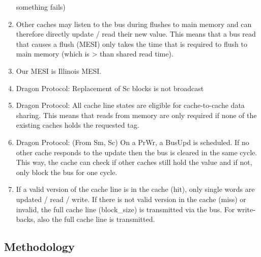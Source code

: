 \begin{enumerate}
          something fails)
    \item Other caches may listen to the bus during flushes to main memory and can therefore directly
          update / read their new value. This means that a bus read that causes a flush (MESI) only takes the
          time that is required to flush to main memory (which is > than shared read time).
    \item Our MESI is Illinois MESI.
    \item Dragon Protocol: Replacement of Sc blocks is not broadcast
    \item Dragon Protocol: All cache line states are eligible for cache-to-cache data sharing. This
          means that reads from memory are only required if none of the existing caches holds the requested
          tag.
    \item Dragon Protocol: (From Sm, Sc) On a PrWr, a BusUpd is scheduled. If no other cache responds to
          the update then the bus is cleared in the same cycle. This way, the cache can check if other caches
          still hold the value and if not, only block the bus for one cycle.
    \item If a valid version of the cache line is in the cache (hit), only single words are updated /
          read / write. If there is not valid version in the cache (miss) or invalid, the full cache line
          (block\_size) is transmitted via the bus. For write-backs, also the full cache line is transmitted.
\end{enumerate}
\subsection{Methodology}
